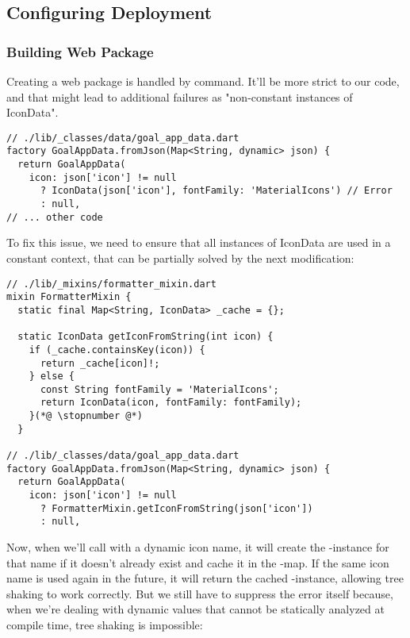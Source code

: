 
\subsection{Configuring Deployment}


\subsubsection{Building Web Package}

Creating a web package is handled by  command. It'll be more strict to our code, and 
that might lead to additional failures as "non-constant instances of IconData".

\begin{lstlisting}
// ./lib/_classes/data/goal_app_data.dart
factory GoalAppData.fromJson(Map<String, dynamic> json) {
  return GoalAppData(
    icon: json['icon'] != null
      ? IconData(json['icon'], fontFamily: 'MaterialIcons') // Error
      : null,
// ... other code
\end{lstlisting}

\noindent To fix this issue, we need to ensure that all instances of IconData are used in a constant context, that can 
be partially solved by the next modification:
\begin{lstlisting}
// ./lib/_mixins/formatter_mixin.dart
mixin FormatterMixin {
  static final Map<String, IconData> _cache = {};

  static IconData getIconFromString(int icon) {
    if (_cache.containsKey(icon)) {
      return _cache[icon]!;
    } else {
      const String fontFamily = 'MaterialIcons';
      return IconData(icon, fontFamily: fontFamily);
    }(*@ \stopnumber @*)
  }

// ./lib/_classes/data/goal_app_data.dart
factory GoalAppData.fromJson(Map<String, dynamic> json) {
  return GoalAppData(
    icon: json['icon'] != null
      ? FormatterMixin.getIconFromString(json['icon'])
      : null,
\end{lstlisting}

Now, when we'll call  with a dynamic icon name, it will create the -instance for that name 
if it doesn't already exist and cache it in the -map. If the same icon name is used again in the future, 
it will return the cached -instance, allowing tree shaking to work correctly. But we still have to suppress 
the error itself because, when we're dealing with dynamic values that cannot be statically analyzed at compile time, 
tree shaking is impossible:

